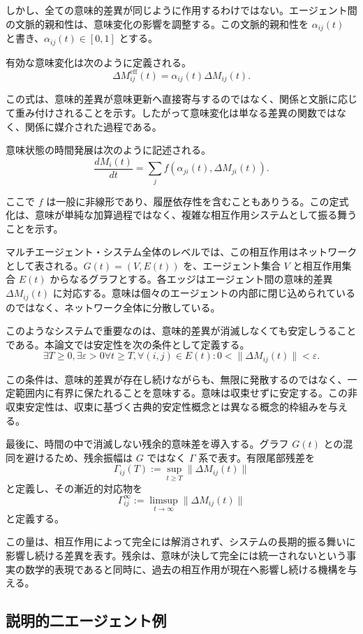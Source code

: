 \documentclass[11pt,a4paper]{article}
\theoremstyle{definition}
\begin{document}
しかし、全ての意味的差異が同じように作用するわけではない。エージェント間の文脈的親和性は、意味変化の影響を調整する。この文脈的親和性を $\alpha_{ij}(t)$ と書き、$\alpha_{ij}(t) \in [0, 1]$ とする。

有効な意味変化は次のように定義される。
\[
\Delta M^{\text{eff}}_{ij}(t) = \alpha_{ij}(t) \Delta M_{ij}(t).
\]

この式は、意味的差異が意味更新へ直接寄与するのではなく、関係と文脈に応じて重み付けされることを示す。したがって意味変化は単なる差異の関数ではなく、関係に媒介された過程である。

意味状態の時間発展は次のように記述される。
\[
\frac{dM_i(t)}{dt} = \sum_j f(\alpha_{ji}(t), \Delta M_{ji}(t)).
\]

ここで $f$ は一般に非線形であり、履歴依存性を含むこともありうる。この定式化は、意味が単純な加算過程ではなく、複雑な相互作用システムとして振る舞うことを示す。

マルチエージェント・システム全体のレベルでは、この相互作用はネットワークとして表される。$G(t) = (V, E(t))$ を、エージェント集合 $V$ と相互作用集合 $E(t)$ からなるグラフとする。各エッジはエージェント間の意味的差異 $\Delta M_{ij}(t)$ に対応する。意味は個々のエージェントの内部に閉じ込められているのではなく、ネットワーク全体に分散している。

このようなシステムで重要なのは、意味的差異が消滅しなくても安定しうることである。本論文では安定性を次の条件として定義する。
\[
\exists T \geq 0, \exists \varepsilon > 0 \forall t \geq T, \forall (i,j) \in E(t) : 0 < \|\Delta M_{ij}(t)\| < \varepsilon.
\]

この条件は、意味的差異が存在し続けながらも、無限に発散するのではなく、一定範囲内に有界に保たれることを意味する。意味は収束せずに安定する。この非収束安定性は、収束に基づく古典的安定性概念とは異なる概念的枠組みを与える。

最後に、時間の中で消滅しない残余的意味差を導入する。グラフ $G(t)$ との混同を避けるため、残余振幅は $G$ ではなく $\Gamma$ 系で表す。有限尾部残差を
\[
\Gamma_{ij}(T)
:=
\sup_{t \ge T}
\|\Delta M_{ij}(t)\|
\]
と定義し、その漸近的対応物を
\[
\Gamma_{ij}^{\infty}
:=
\limsup_{t \to \infty}
\|\Delta M_{ij}(t)\|
\]
と定義する。

この量は、相互作用によって完全には解消されず、システムの長期的振る舞いに影響し続ける差異を表す。残余は、意味が決して完全には統一されないという事実の数学的表現であると同時に、過去の相互作用が現在へ影響し続ける機構を与える。


\subsection{説明的二エージェント例}
\end{document}
